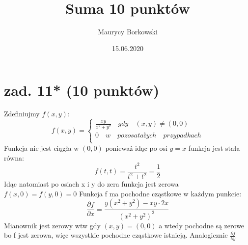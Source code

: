 \documentclass{article}
\title{Suma 10 punktów}
\date{15.06.2020}
\author{Maurycy Borkowski}
\begin{document}
\maketitle
\section{zad. 11* (10 punktów)}
Zdefiniujmy $f(x,y)$:
$$
f(x,y) =
\begin{cases}
\frac{xy}{x^2+y^2} \quad gdy \quad (x,y) \neq (0,0) \\
0 \quad w \quad pozosatałych \quad przypadkach\\
\end{cases}
$$
Funkcja nie jest ciągła w $(0,0)$ ponieważ idąc po osi $y = x$
funkcja jest stała równa:
$$
f(t,t) = \frac{t^2}{t^2 + t^2} = \frac{1}{2}
$$
Idąc natomiast po osiach x i y do zera funkcja jest zerowa $f(x,0) = f(y,0) = 0$
Funkcja f ma pochodne cząstkowe w każdym punkcie:
$$
\frac{\partial f}{\partial x} = \frac{y(x^2+y^2) -xy\cdot2x}{(x^2+y^2)^2}
$$
Mianownik jest zerowy wtw gdy $(x,y) = (0,0)$  a wtedy pochodne są zerowe bo f jest zerowa, więc wszystkie pochodne cząstkowe istnieją. Analogicznie $\frac{\partial f}{\partial y}$
\end{document}

